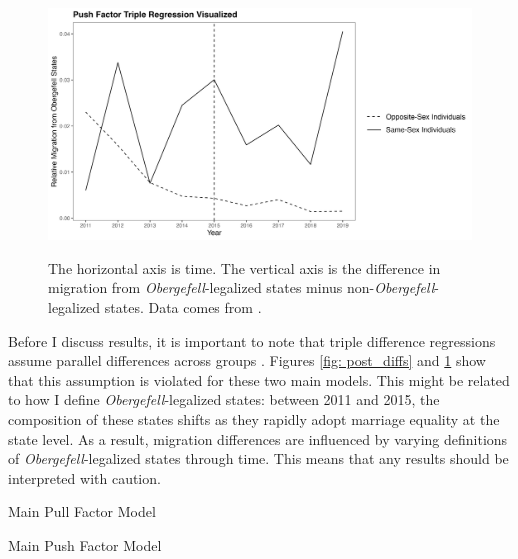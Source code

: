 \documentclass[12pt,letterpaper]{article}
\begin{document}
\begin{figure}[htbp]
    \centering
    \caption{}
    \label{fig: ante_diffs}
    \includegraphics[width=0.75\linewidth]{outputs/summary_stats/ante_diffs.png}

    \vspace{0.5em}
    \begin{minipage}{0.75\linewidth}
        \footnotesize The horizontal axis is time. The vertical axis is the difference in migration from \textit{Obergefell}-legalized states minus non-\textit{Obergefell}-legalized states. Data comes from \citet{28}.
    \end{minipage}
\end{figure}

Before I discuss results, it is important to note that triple difference regressions assume parallel differences across groups \citep{23, 24, 25}. Figures \ref{fig: post_diffs} and \ref{fig: ante_diffs} show that this assumption is violated for these two main models. This might be related to how I define \textit{Obergefell}-legalized states: between 2011 and 2015, the composition of these states shifts as they rapidly adopt marriage equality at the state level. As a result, migration differences are influenced by varying definitions of \textit{Obergefell}-legalized states through time. This means that any results should be interpreted with caution.

\begin{table}[htbp]
    \centering
    \caption{Main Pull Factor Model}
    \label{tab: expost_model}
    
\end{table}
\begin{table}[htbp]
    \centering
    \caption{Main Push Factor Model}
    \label{tab: exante_model}
    
\end{table}
\end{document}
